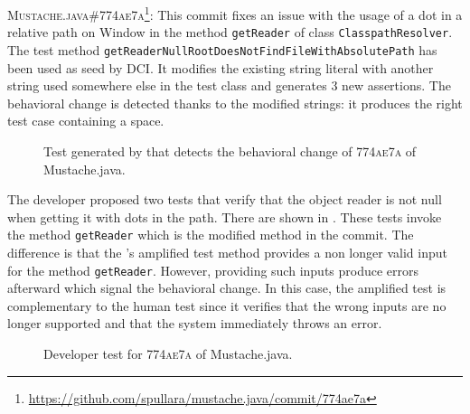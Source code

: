 \textsc{Mustache.java\#774ae7a}\footnote{\url{https://github.com/spullara/mustache.java/commit/774ae7a}}: This commit fixes an issue with the usage of a dot in a  relative path on Window in the method \texttt{getReader} of class \texttt{ClasspathResolver}.
The test method \texttt{getReaderNullRootDoesNotFindFileWithAbsolutePath} has been used as seed by DCI. It modifies the existing string literal with another string used somewhere else in the test class and generates 3 new assertions.
The behavioral change is detected thanks to the modified strings: it produces the right test case containing a space.

\begin{figure}[h]
\centering
{}
\caption{Test generated by \DCII that detects the behavioral change of \textsc{774ae7a} of Mustache.java.}
\label{fig:ampl_mustache}
\end{figure}

The developer proposed two tests that verify that the object reader is not null when getting it with dots in the path.
There are shown in .
These tests invoke the method \texttt{getReader} which is the modified method in the commit.
%
The difference is that the \DCII's amplified test method provides a non longer valid input for the method \texttt{getReader}.
However, providing such inputs produce errors afterward which signal the behavioral change.
In this case, the amplified test is complementary to the human test since it verifies that the wrong inputs are no longer supported and that the system immediately throws an error.

\begin{figure}[h]
\centering
{}
\caption{Developer test for \textsc{774ae7a} of Mustache.java.}
\label{fig:diff_mustache}
\end{figure}

